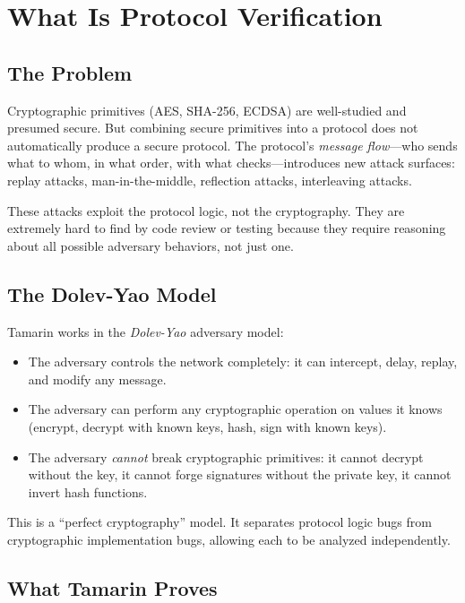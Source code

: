 \section{What Is Protocol Verification}


\subsection{The Problem}

Cryptographic primitives (AES, SHA-256, ECDSA) are well-studied and presumed secure.
But combining secure primitives into a protocol does not automatically produce a secure
protocol. The protocol's \emph{message flow}---who sends what to whom, in what order,
with what checks---introduces new attack surfaces: replay attacks, man-in-the-middle,
reflection attacks, interleaving attacks.

These attacks exploit the protocol logic, not the cryptography. They are extremely hard
to find by code review or testing because they require reasoning about all possible
adversary behaviors, not just one.

\subsection{The Dolev-Yao Model}

Tamarin works in the \emph{Dolev-Yao} adversary model:
\begin{itemize}[nosep]
  \item The adversary controls the network completely: it can intercept, delay, replay,
    and modify any message.
  \item The adversary can perform any cryptographic operation on values it knows (encrypt,
    decrypt with known keys, hash, sign with known keys).
  \item The adversary \emph{cannot} break cryptographic primitives: it cannot decrypt
    without the key, it cannot forge signatures without the private key, it cannot
    invert hash functions.
\end{itemize}

This is a ``perfect cryptography'' model. It separates protocol logic bugs from
cryptographic implementation bugs, allowing each to be analyzed independently.

\subsection{What Tamarin Proves}

